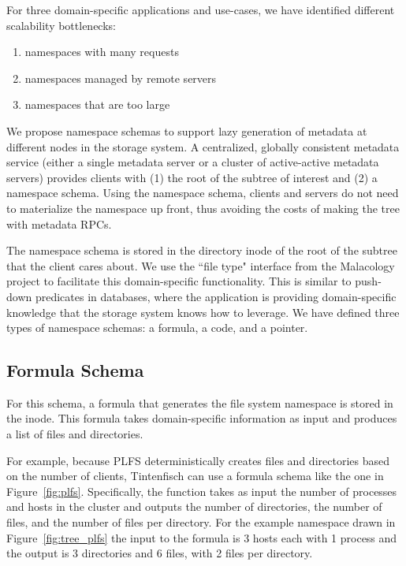 For three domain-specific applications and use-cases, we have identified
different scalability bottlenecks:

\begin{enumerate}
  \item namespaces with many requests
  \item namespaces managed by remote servers
  \item namespaces that are too large
\end{enumerate}

We propose namespace schemas to support lazy generation of metadata at
different nodes in the storage system.  A centralized, globally consistent
metadata service (either a single metadata server or a cluster of active-active
metadata servers) provides clients with (1) the root of the subtree of interest
and (2) a namespace schema. Using the namespace schema, clients and servers do
not need to materialize the namespace up front, thus avoiding the costs of
making the tree with metadata RPCs.

The namespace schema is stored in the directory inode of the root of the
subtree that the client cares about. We use the ``file type" interface from the
Malacology~\cite{sevilla:eurosys17-malacology} project to facilitate this
domain-specific functionality. This is similar to push-down predicates in
databases, where the application is providing domain-specific knowledge that
the storage system knows how to leverage.  We have defined three types of
namespace schemas: a formula, a code, and a pointer.

\subsection{Formula Schema} 

For this schema, a formula that generates the file system namespace is stored
in the inode. This formula takes domain-specific information as input and
produces a list of files and directories.

For example, because PLFS deterministically creates files and directories based
on the number of clients, Tintenfisch can use a formula schema like the one in
Figure~\ref{fig:plfs}. Specifically, the function takes as input the number of
processes and hosts in the cluster and outputs the number of directories, the
number of files, and the number of files per directory. For the example
namespace drawn in Figure~\ref{fig:tree_plfs} the input to the formula is 3
hosts each with 1 process and the output is 3 directories and 6 files, with 2
files per directory.

